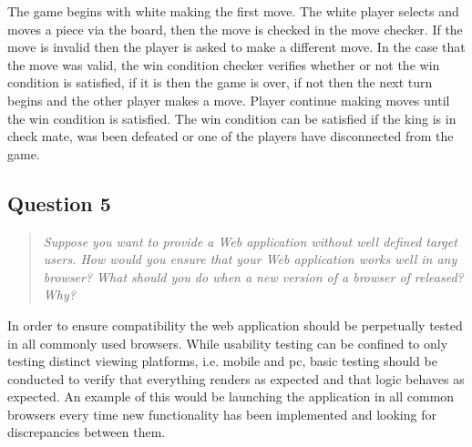 \documentclass[10pt,a4paper]{report}
\begin{document}
{}

The game begins with white making the first move. The white player selects and moves a piece via the board, then the move is checked in the move checker. If the move is invalid then the player is asked to make a different move. In the case that the move was valid, the win condition checker verifies whether or not the win condition is satisfied, if it is then the game is over, if not then the next turn begins and the other player makes a move. Player continue making moves until the win condition is satisfied. The win condition can be satisfied if the king is in check mate, was been defeated or one of the players have disconnected from the game.

\subsection*{Question 5}
\begin{quote}
\textit{Suppose you want to provide a Web application without well defined target users. How would you ensure that your Web application works well in any browser? What should you do when a new version of a browser of released? Why?}
\end{quote}
In order to ensure compatibility the web application should be perpetually tested in all commonly used browsers. While usability testing can be confined to only testing distinct viewing platforms, i.e. mobile and pc, basic testing should be conducted to verify that everything renders as expected and that logic behaves as expected. An example of this would be launching the application in all common browsers every time new functionality has been implemented and looking for discrepancies between them. 
\end{document}
